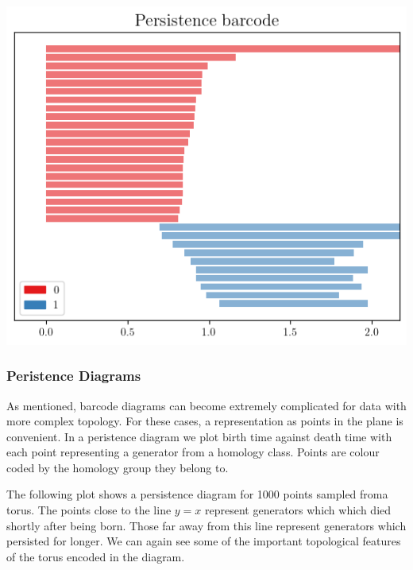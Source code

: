 \begin{center}
\includegraphics[scale=0.8]{figures/torus_barcode.png}
\end{center}


\subsubsection{Peristence Diagrams}

As mentioned, barcode diagrams can become extremely complicated for data with more complex topology. For these cases, a representation as points in the plane is convenient. In a peristence diagram we plot birth time against death time with each point representing a generator from a homology class. Points are colour coded by the homology group they belong to.

The following plot shows a persistence diagram for 1000 points sampled froma  torus. The points close to the line $y = x$ represent generators which which died shortly after being born. Those far away from this line represent generators which persisted for longer. We can again see some of the important topological features of the torus encoded in the diagram.

